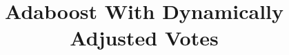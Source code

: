\documentclass[conference]{IEEEtran}
\begin{document}
%
\title{Adaboost With Dynamically Adjusted Votes}

\author{
}

\maketitle














\end{document}
